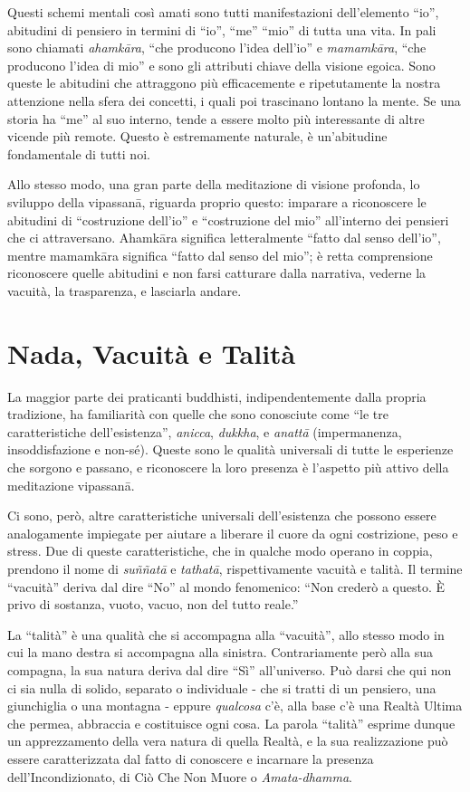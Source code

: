 Questi schemi mentali così amati sono tutti manifestazioni dell'elemento
``io'', abitudini di pensiero in termini di ``io'', ``me'' ``mio'' di
tutta una vita. In pali sono chiamati \emph{ahamkāra}, ``che producono
l'idea dell'io'' e \emph{mamamkāra}, ``che producono l'idea di mio'' e
sono gli attributi chiave della visione egoica. Sono queste le abitudini
che attraggono più efficacemente e ripetutamente la nostra attenzione
nella sfera dei concetti, i quali poi trascinano lontano la mente. Se
una storia ha ``me'' al suo interno, tende a essere molto più
interessante di altre vicende più remote. Questo è estremamente
naturale, è un'abitudine fondamentale di tutti noi.

Allo stesso modo, una gran parte della meditazione di visione profonda,
lo sviluppo della vipassanā, riguarda proprio questo: imparare a
riconoscere le abitudini di ``costruzione dell'io'' e ``costruzione del
mio'' all'interno dei pensieri che ci attraversano. Ahamkāra significa
letteralmente ``fatto dal senso dell'io'', mentre mamamkāra significa
``fatto dal senso del mio''; è retta comprensione riconoscere quelle
abitudini e non farsi catturare dalla narrativa, vederne la vacuità, la
trasparenza, e lasciarla andare.

\section{Nada, Vacuità e Talità}

La maggior parte dei praticanti buddhisti, indipendentemente dalla
propria tradizione, ha familiarità con quelle che sono conosciute come
``le tre caratteristiche dell'esistenza'', \emph{anicca}, \emph{dukkha},
e \emph{anattā} (impermanenza, insoddisfazione e non-sé). Queste sono le
qualità universali di tutte le esperienze che sorgono e passano, e
riconoscere la loro presenza è l'aspetto più attivo della meditazione
vipassanā.

Ci sono, però, altre caratteristiche universali dell'esistenza che
possono essere analogamente impiegate per aiutare a liberare il cuore da
ogni costrizione, peso e stress. Due di queste caratteristiche, che in
qualche modo operano in coppia, prendono il nome di \emph{suññatā} e
\emph{tathatā}, rispettivamente vacuità e talità. Il termine ``vacuità''
deriva dal dire ``No'' al mondo fenomenico: ``Non crederò a questo. È
privo di sostanza, vuoto, vacuo, non del tutto reale.''

La ``talità'' è una qualità che si accompagna alla ``vacuità'', allo
stesso modo in cui la mano destra si accompagna alla sinistra.
Contrariamente però alla sua compagna, la sua natura deriva dal dire
``Sì'' all'universo. Può darsi che qui non ci sia nulla di solido,
separato o individuale - che si tratti di un pensiero, una giunchiglia o
una montagna - eppure \emph{qualcosa} c'è, alla base c'è una Realtà
Ultima che permea, abbraccia e costituisce ogni cosa. La parola
``talità'' esprime dunque un apprezzamento della vera natura di quella
Realtà, e la sua realizzazione può essere caratterizzata dal fatto di
conoscere e incarnare la presenza dell'Incondizionato, di Ciò Che Non
Muore o \emph{Amata-dhamma}.

